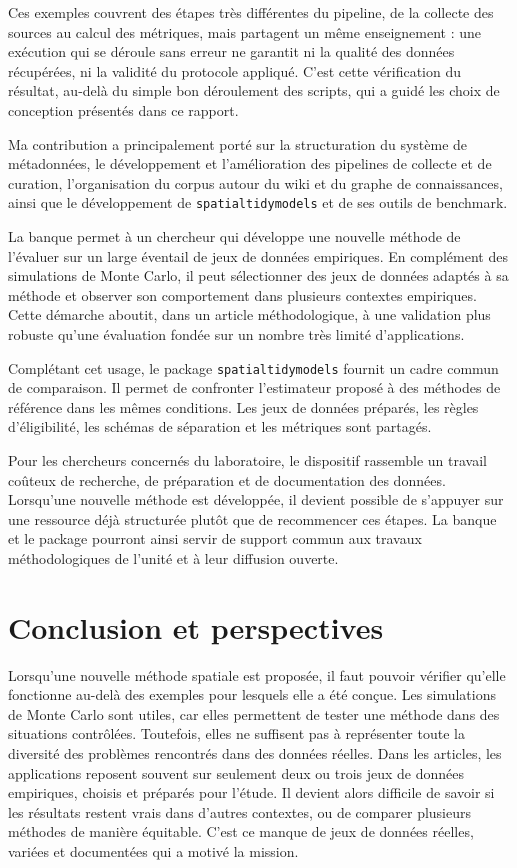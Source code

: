\documentclass[11pt,a4paper]{article}
\begin{document}
Ces exemples couvrent des étapes très différentes du pipeline, de la collecte des sources au calcul des métriques, mais partagent un même enseignement : une exécution qui se déroule sans erreur ne garantit ni la qualité des données récupérées, ni la validité du protocole appliqué. C'est cette vérification du résultat, au-delà du simple bon déroulement des scripts, qui a guidé les choix de conception présentés dans ce rapport.

Ma contribution a principalement porté sur la structuration du système de métadonnées, le développement et l'amélioration des pipelines de collecte et de curation, l'organisation du corpus autour du wiki et du graphe de connaissances, ainsi que le développement de \texttt{spatialtidymodels} et de ses outils de benchmark.

La banque permet à un chercheur qui développe une nouvelle méthode de l'évaluer sur un large éventail de jeux de données empiriques. En complément des simulations de Monte Carlo, il peut sélectionner des jeux de données adaptés à sa méthode et observer son comportement dans plusieurs contextes empiriques. Cette démarche aboutit, dans un article méthodologique, à une validation plus robuste qu'une évaluation fondée sur un nombre très limité d'applications.

Complétant cet usage, le package \texttt{spatialtidymodels} fournit un cadre commun de comparaison. Il permet de confronter l'estimateur proposé à des méthodes de référence dans les mêmes conditions. Les jeux de données préparés, les règles d'éligibilité, les schémas de séparation et les métriques sont partagés.

Pour les chercheurs concernés du laboratoire, le dispositif rassemble un travail coûteux de recherche, de préparation et de documentation des données. Lorsqu'une nouvelle méthode est développée, il devient possible de s'appuyer sur une ressource déjà structurée plutôt que de recommencer ces étapes. La banque et le package pourront ainsi servir de support commun aux travaux méthodologiques de l'unité et à leur diffusion ouverte.

\section{Conclusion et perspectives}

Lorsqu'une nouvelle méthode spatiale est proposée, il faut pouvoir vérifier qu'elle fonctionne au-delà des exemples pour lesquels elle a été conçue. Les simulations de Monte Carlo sont utiles, car elles permettent de tester une méthode dans des situations contrôlées. Toutefois, elles ne suffisent pas à représenter toute la diversité des problèmes rencontrés dans des données réelles. Dans les articles, les applications reposent souvent sur seulement deux ou trois jeux de données empiriques, choisis et préparés pour l'étude. Il devient alors difficile de savoir si les résultats restent vrais dans d'autres contextes, ou de comparer plusieurs méthodes de manière équitable. C'est ce manque de jeux de données réelles, variées et documentées qui a motivé la mission.
\end{document}
